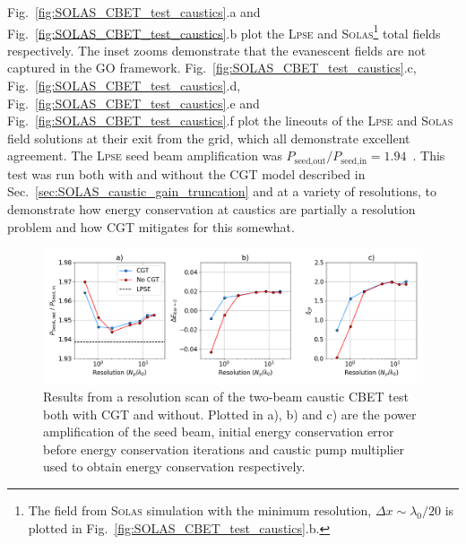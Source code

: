 Fig.~\ref{fig:SOLAS_CBET_test_caustics}.a and Fig.~\ref{fig:SOLAS_CBET_test_caustics}.b plot the \textsc{Lpse} and \textsc{Solas}\footnote{The field from \textsc{Solas} simulation with the minimum resolution, $\Delta x \sim \lambda_0/20$ is plotted in Fig.~\ref{fig:SOLAS_CBET_test_caustics}.b.} total fields respectively.
The inset zooms demonstrate that the evanescent fields are not captured in the \ac{GO} framework.
Fig.~\ref{fig:SOLAS_CBET_test_caustics}.c, Fig.~\ref{fig:SOLAS_CBET_test_caustics}.d, Fig.~\ref{fig:SOLAS_CBET_test_caustics}.e and Fig.~\ref{fig:SOLAS_CBET_test_caustics}.f plot the lineouts of the \textsc{Lpse} and \textsc{Solas} field solutions at their exit from the grid, which all demonstrate excellent agreement.
The \textsc{Lpse} seed beam amplification was $P_{\text{seed,out}}/P_{\text{seed,in}}=1.94$~\cite{follett_validation_2022}.
This test was run both with and without the \ac{CGT} model described in Sec.~\ref{sec:SOLAS_caustic_gain_truncation} and at a variety of resolutions, to demonstrate how energy conservation at caustics are partially a resolution problem and how \ac{CGT} mitigates for this somewhat.

\begin{figure}[t!]
    \includegraphics[width=1.0\linewidth]{Numerics/Images/caustic_cbet_test_resscan.png}
    \centering
    \caption{Results from a resolution scan of the two-beam caustic \ac{CBET} test both with \ac{CGT} and without.
    Plotted in a), b) and c) are the power amplification of the seed beam, initial energy conservation error before energy conservation iterations and caustic pump multiplier used to obtain energy conservation respectively.}%
    \label{fig:SOLAS_CBET_test_caustics_resscan}
\end{figure}

